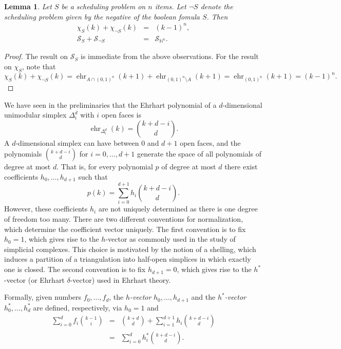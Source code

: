 \documentclass[12pt,reqno]{amsart}
\numberwithin{definition}{section}
\newtheorem{lemma}[definition]{Lemma}
\theoremstyle{definition}
\newcommand{\NN}{\mathbb{N}}
\newcommand{\SSS}{\mathcal{S}}
\newcommand{\ehr}{\operatorname{ehr}}
\newcommand{\poly}{\chi} %
\begin{document}
\begin{lemma}
Let $S$ be a scheduling problem on $n$ items. Let $\neg S$ denote the scheduling problem given by the negative of the boolean fomula $S$. Then 
\begin{eqnarray*}
  \poly_{S}(k) + \poly_{\neg S}(k) &=& (k-1)^n, \\
  \SSS_S + \SSS_{\neg S} &=& \SSS_{\NN^n}.
\end{eqnarray*}
\end{lemma}


\begin{proof}
The result on $\SSS_S$ is immediate from the above observations. For the result on $\poly_S$, note that 
\[
 \poly_{S}(k) + \poly_{\neg S}(k) = \ehr_{A\cap(0,1)^n}(k+1) +  \ehr_{(0,1)^n\setminus A}(k+1) = \ehr_{(0,1)^n}(k+1) = (k-1)^n.
\]
\end{proof}

We have seen in the preliminaries that the Ehrhart polynomial of a $d$-dimensional unimodular simplex $\Delta^d_i$ with $i$ open faces is
\[
  \ehr_{\Delta^d_i}(k) = \binom{k+d-i}{d}.
\]
A $d$-dimensional simplex can have between 0 and $d+1$ open faces, and the polynomials $\binom{k+d-i}{d}$ for $i=0,\ldots,d+1$ generate the space of all polynomials of degree at most $d$. That is, for every polynomial $p$ of degree at most $d$ there exist coefficients $h_0,\ldots,h_{d+1}$ such that
\[
  p(k) = \sum_{i=0}^{d+1} h_i \binom{k+d-i}{d}.
\] 
However, these coefficients $h_i$ are not uniquely determined as there is one degree of freedom too many. There are two different conventions for normalization, which determine the coefficient vector uniquely. The first convention is to fix $h_0=1$, which gives rise to the $h$-vector as commonly used in the study of simplicial complexes. This choice is motivated by the notion of a shelling, which induces a partition of a triangulation into half-open simplices in which exactly one is closed. The second convention is to fix $h_{d+1}=0$, which gives rise to the $h^*$-vector (or Ehrhart $\delta$-vector) used in Ehrhart theory. 

Formally, given numbers $f_0,\ldots,f_d$, the \emph{$h$-vector} $h_0,\ldots,h_{d+1}$ and the \emph{$h^*$-vector} $h^*_0,\ldots,h^*_{d}$ are defined, respectively, via $h_0=1$ and
\begin{eqnarray*}
  \sum_{i=0}^{d} f_i \binom{k-1}{i} & = &
  \binom{k+d}{d} + \sum_{i=1}^{d+1} h_i \binom{k+d-i}{d} 
  \\ 
  & = & \sum_{i=0}^{d} h^*_i \binom{k+d-i}{d}. 
\end{eqnarray*}
\end{document}
